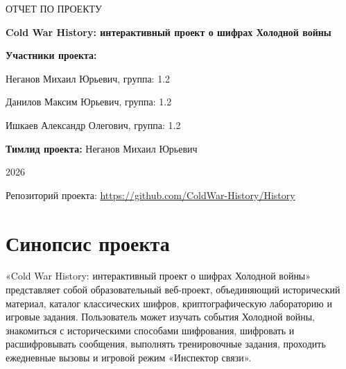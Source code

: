 \documentclass[14pt,a4paper]{extarticle}
\begin{document}

\begin{titlepage}
  \begin{center}
    \vspace*{2cm}

    {\large ОТЧЕТ ПО ПРОЕКТУ\par}

    \vspace{2cm}

    {\Large\bfseries Cold War History: интерактивный проект о шифрах Холодной войны\par}

    \vspace{2.5cm}

    \begin{flushleft}
      \textbf{Участники проекта:}

      Неганов Михаил Юрьевич, группа: 1.2

      Данилов Максим Юрьевич, группа: 1.2

      Ишкаев Александр Олегович, группа: 1.2

      \vspace{0.5cm}

      \textbf{Тимлид проекта:} Неганов Михаил Юрьевич
      \end{flushleft}

    \vfill

    {\large 2026}

    \vspace{0.8cm}

    \small Репозиторий проекта: \url{https://github.com/ColdWar-History/History}
  \end{center}
\end{titlepage}


\section{Синопсис проекта}

«Cold War History: интерактивный проект о шифрах Холодной войны» представляет собой образовательный веб-проект, объединяющий исторический материал, каталог классических шифров, криптографическую лабораторию и игровые задания. Пользователь может изучать события Холодной войны, знакомиться с историческими способами шифрования, шифровать и расшифровывать сообщения, выполнять тренировочные задания, проходить ежедневные вызовы и игровой режим «Инспектор связи».
\end{document}
